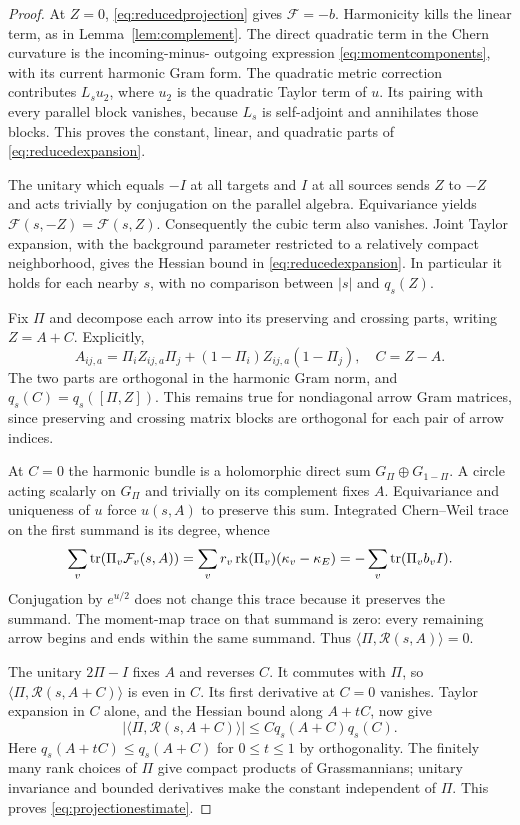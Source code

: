 \begin{proof}
At $Z=0$, \eqref{eq:reducedprojection} gives $\mathcal F=-b$.
Harmonicity kills the linear term, as in Lemma~\ref{lem:complement}.
The direct quadratic term in the Chern curvature is the incoming-minus-
outgoing expression \eqref{eq:momentcomponents}, with its current
harmonic Gram form. The quadratic metric correction contributes
$L_su_2$, where $u_2$ is the quadratic Taylor term of $u$. Its
pairing with every parallel block vanishes, because $L_s$ is
self-adjoint and annihilates those blocks. This proves the constant,
linear, and quadratic parts of \eqref{eq:reducedexpansion}.

The unitary which equals $-I$ at all targets and $I$ at all sources
sends $Z$ to $-Z$ and acts trivially by conjugation on the parallel
algebra. Equivariance yields $\mathcal F(s,-Z)=\mathcal F(s,Z)$.
Consequently the cubic term also vanishes. Joint Taylor expansion,
with the background parameter restricted to a relatively compact
neighborhood, gives the Hessian bound in \eqref{eq:reducedexpansion}.
In particular it holds for each nearby $s$, with no comparison
between $|s|$ and $q_s(Z)$.

Fix $\Pi$ and decompose each arrow into its preserving and crossing
parts, writing $Z=A+C$. Explicitly,
\[
A_{ij,a}=\Pi_iZ_{ij,a}\Pi_j+(1-\Pi_i)Z_{ij,a}(1-\Pi_j),
\quad C=Z-A.
\]
The two parts are orthogonal in the harmonic Gram norm, and
$q_s(C)=q_s([\Pi,Z])$. This remains true for nondiagonal arrow
Gram matrices, since preserving and crossing matrix blocks are
orthogonal for each pair of arrow indices.

At $C=0$ the harmonic bundle is a holomorphic direct sum
$G_\Pi\oplus G_{1-\Pi}$. A circle acting scalarly on $G_\Pi$
and trivially on its complement fixes $A$. Equivariance and
uniqueness of $u$ force $u(s,A)$ to preserve this sum. Integrated
Chern--Weil trace on the first summand is its degree, whence
\begin{equation}\label{eq:projectiondegree}
\sum_v\operatorname{tr}(\Pi_v\mathcal F_v(s,A))
=\sum_vr_v\operatorname{rk}(\Pi_v)(\kappa_v-\kappa_E)
=-\sum_v\operatorname{tr}(\Pi_vb_vI).
\end{equation}
Conjugation by $e^{u/2}$ does not change this trace because it
preserves the summand. The moment-map trace on that summand is
zero: every remaining arrow begins and ends within the same
summand. Thus $\langle\Pi,\mathcal R(s,A)\rangle=0$.

The unitary $2\Pi-I$ fixes $A$ and reverses $C$. It commutes with
$\Pi$, so $\langle\Pi,\mathcal R(s,A+C)\rangle$ is even in $C$.
Its first derivative at $C=0$ vanishes. Taylor expansion in $C$
alone, and the Hessian bound along $A+tC$, now give
\[
|\langle\Pi,\mathcal R(s,A+C)\rangle|
\le Cq_s(A+C)q_s(C).
\]
Here $q_s(A+tC)\le q_s(A+C)$ for $0\le t\le1$ by orthogonality.
The finitely many rank choices of $\Pi$ give compact products of
Grassmannians; unitary invariance and bounded derivatives make
the constant independent of $\Pi$. This proves
\eqref{eq:projectionestimate}.
\end{proof}

